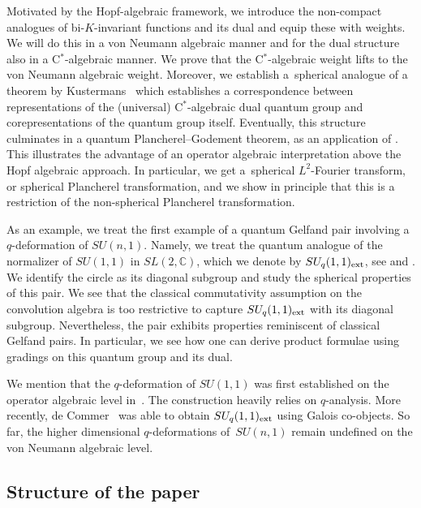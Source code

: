 \documentclass[pdftex]{sigma}
\numberwithin{equation}{section}
\theoremstyle{definition}
\begin{document}
Motivated by the Hopf-algebraic framework, we introduce the non-compact analogues of bi-$K$-invariant functions and its dual \cite{Flo, VaiHyp} and equip these with weights. We will do this in a von Neumann algebraic manner and for the dual structure also in a C$^\ast$-algebraic manner. We prove that the C$^\ast$-algebraic weight lifts to the von Neumann algebraic weight. Moreover, we establish a~spherical analogue of a theorem by Kustermans~\cite{Kus} which establishes a correspondence between representations of the (universal) C$^\ast$-algebraic dual quantum group and corepresentations of the quantum group itself.  Eventually, this structure culminates in a quantum Plancherel--Godement theorem, as an application of \cite[Theorem~3.4.5]{Des}. This illustrates the advantage of an operator algebraic interpretation above the Hopf algebraic approach. In particular, we get a~spherical $L^2$-Fourier transform, or spherical Plancherel transformation, and we show in principle that this is a restriction of the non-spherical Plancherel transformation.

As an example, we treat the f\/irst example of a quantum Gelfand pair involving a $q$-deforma\-tion of $SU(n,1)$. Namely, we treat the quantum analogue of the normalizer of $SU(1,1)$ in $SL(2, \mathbb{C})$, which we denote by $SU_q(1,1)_{\rm ext}$, see \cite{KoeKus} and \cite{GroKoeKus}. We identify the circle as its diagonal subgroup and study the spherical properties of this pair.
We  see that the classical commutativity assumption on the convolution algebra is too restrictive to capture $SU_q(1,1)_{\rm ext}$ with its diagonal subgroup. Nevertheless, the pair exhibits properties reminiscent of classical Gelfand pairs. In particular, we  see how one can  derive product formulae using gradings on this quantum group and its dual.

We mention that the $q$-deformation of $SU(1,1)$ was f\/irst established on the operator algebraic level in~\cite{KoeKus}. The construction heavily relies on $q$-analysis. More recently, de Commer~\cite{ComSU} was able to obtain $SU_q(1,1)_{\rm ext}$ using Galois co-objects. So far, the higher dimensional $q$-deformations of~$SU(n,1)$ remain undef\/ined on the von Neumann algebraic level.


\vspace{-2mm}

\subsection*{Structure of the paper}
\end{document}
